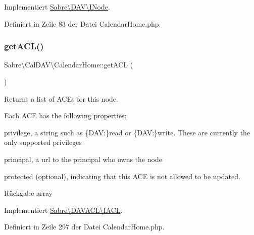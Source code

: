 Implementiert \mbox{\hyperlink{interface_sabre_1_1_d_a_v_1_1_i_node_a72cd0ee4e36dfced2b0412d14dbd73e6}{Sabre\textbackslash{}\+D\+A\+V\textbackslash{}\+I\+Node}}.



Definiert in Zeile 83 der Datei Calendar\+Home.\+php.

\mbox{\label{class_sabre_1_1_cal_d_a_v_1_1_calendar_home_ae0d277110da1fcc90378591dbde19b82}} 
\subsubsection{\texorpdfstring{get\+A\+C\+L()}{getACL()}}
{\footnotesize\ttfamily Sabre\textbackslash{}\+Cal\+D\+A\+V\textbackslash{}\+Calendar\+Home\+::get\+A\+CL (\begin{DoxyParamCaption}{ }\end{DoxyParamCaption})}

Returns a list of A\+CE\textquotesingle{}s for this node.

Each A\+CE has the following properties\+:
\begin{DoxyItemize}
\item \textquotesingle{}privilege\textquotesingle{}, a string such as \{D\+AV\+:\}read or \{D\+AV\+:\}write. These are currently the only supported privileges
\item \textquotesingle{}principal\textquotesingle{}, a url to the principal who owns the node
\item \textquotesingle{}protected\textquotesingle{} (optional), indicating that this A\+CE is not allowed to be updated.
\end{DoxyItemize}

\begin{DoxyReturn}{Rückgabe}
array 
\end{DoxyReturn}


Implementiert \mbox{\hyperlink{interface_sabre_1_1_d_a_v_a_c_l_1_1_i_a_c_l_a8fe3b3a5b48eae789d7eb722b340045c}{Sabre\textbackslash{}\+D\+A\+V\+A\+C\+L\textbackslash{}\+I\+A\+CL}}.



Definiert in Zeile 297 der Datei Calendar\+Home.\+php.

\mbox{\label{class_sabre_1_1_cal_d_a_v_1_1_calendar_home_a51af634cae3520b0c0169bd273dae32e}} 
